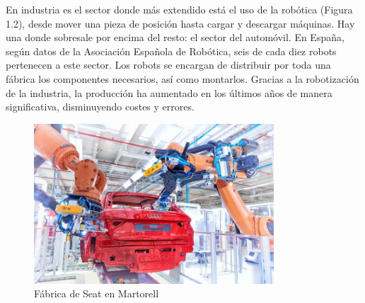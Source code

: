 En industria es el sector donde más extendido está el uso de la robótica (Figura 1.2), desde mover una pieza de posición hasta cargar y descargar máquinas. Hay una donde sobresale por encima del resto: el sector del automóvil. En España, según datos de la Asociación Española de Robótica, seis de cada diez robots pertenecen a este sector. Los robots se encargan de distribuir por toda una fábrica los componentes necesarios, así como montarlos. Gracias a la robotización de la industria, la producción ha aumentado en los últimos años de manera significativa, disminuyendo costes y errores.
\begin{figure}[H]
  \begin{center}
    \includegraphics[width=0.8\textwidth]{figures/robotautomovil.jpg}
		\caption{Fábrica de Seat en Martorell}
		\label{fig.robotautomovil}
		\end{center}
\end{figure}

